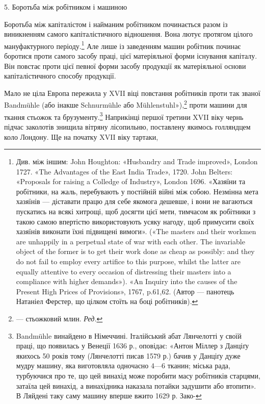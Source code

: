 5. Боротьба між робітником і машиною

Боротьба між капіталістом і найманим робітником починається
разом із виникненням самого капіталістичного відношення. Вона
лютує протягом цілого мануфактурного періоду.\footnote{
Див. між іншим: John Houghton: «Husbandry and Trade improved»,
London 1727. «The Advantages of the East India Trade», 1720.
John Belters: «Proposals for raising a Colledge of Industry», London
1696. «Хазяїни та робітники, на жаль, перебувають у постійній війні
між собою. Незмінна мета хазяїнів — діставати працю для себе якомога
дешевше, і вони не вагаються пускатись на всякі хитрощі, щоб досягти
цієї мети, тимчасом як робітники з такою самою впертістю використовують
усяку нагоду, щоб примусити своїх хазяїнів виконати їхні підвищені
вимоги». («The masters and their workmen are unhappily in a perpetual
state of war with each other. The invariable object of the former is to
get their work done as cheap as possibly: and they do not fail to employ
every artifice to this purpose, whilst the latter are equally attentive to
every occasion of distressing their masters into a compliance with higher
demands»). «An Inquiry into the causes of the Present High Prices of
Provisions», 1767, p.61,62. (Автор — панотець Натаніел Ферстер, що цілком
стоїть на боці робітників).
} Але лише
із заведенням машин робітник починає боротися проти самого
засобу праці, цієї матеріяльної форми існування капіталу. Він
повстає проти цієї певної форми засобу продукції як матеріяльної
основи капіталістичного способу продукції.

Мало не ціла Европа пережила у XVII віці повстання робітників
проти так званої Bandmühle (або інакше Schnurmühle
або Mühlenstuhl»),\footnote*{
— стьожковий млин. \emph{Ред.}
} проти машини для ткання стьожок та брузументу.\footnote{
Bandmühle винайдено в Німеччині. Італійський абат Лянчелотті
у своїй праці, що появилась у Венеції 1636 р., оповідає: «Антон Міллер
з Данціґу якихось 50 років тому (Лянчелотті писав 1579 р.) бачив у Данціґу
дуже мудру машину, яка виготовляла одночасно 4—6 тканин; міська
рада, турбуючися про те, що цей винахід може поробити масу робітників
старцями, затаїла цей винахід, а винахідника наказала потайки задушити
або втопити». В Ляйдені таку саму машину вперше вжито 1629 р. Зако-
} Наприкінці першої третини XVII віку чернь підчас
заколотів знищила вітряну лісопильню, поставлену якимось голляндцем
коло Лондону. Ще на початку XVII віку тартаки,

